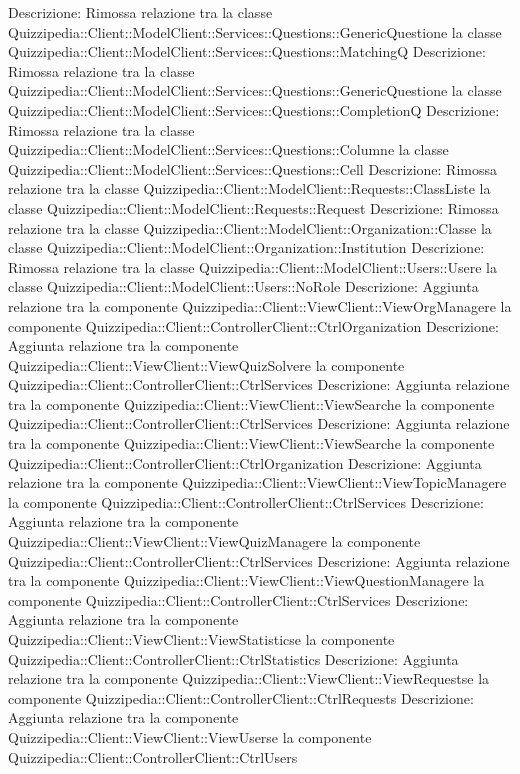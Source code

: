 Descrizione: Rimossa relazione tra la classe Quizzipedia::Client::ModelClient::Services::Questions::GenericQuestione la classe Quizzipedia::Client::ModelClient::Services::Questions::MatchingQ 
Descrizione: Rimossa relazione tra la classe Quizzipedia::Client::ModelClient::Services::Questions::GenericQuestione la classe Quizzipedia::Client::ModelClient::Services::Questions::CompletionQ 
Descrizione: Rimossa relazione tra la classe Quizzipedia::Client::ModelClient::Services::Questions::Columne la classe Quizzipedia::Client::ModelClient::Services::Questions::Cell 
Descrizione: Rimossa relazione tra la classe Quizzipedia::Client::ModelClient::Requests::ClassListe la classe Quizzipedia::Client::ModelClient::Requests::Request 
Descrizione: Rimossa relazione tra la classe Quizzipedia::Client::ModelClient::Organization::Classe la classe Quizzipedia::Client::ModelClient::Organization::Institution 
Descrizione: Rimossa relazione tra la classe Quizzipedia::Client::ModelClient::Users::Usere la classe Quizzipedia::Client::ModelClient::Users::NoRole 
Descrizione: Aggiunta relazione tra la componente Quizzipedia::Client::ViewClient::ViewOrgManagere la componente Quizzipedia::Client::ControllerClient::CtrlOrganization 
Descrizione: Aggiunta relazione tra la componente Quizzipedia::Client::ViewClient::ViewQuizSolvere la componente Quizzipedia::Client::ControllerClient::CtrlServices 
Descrizione: Aggiunta relazione tra la componente Quizzipedia::Client::ViewClient::ViewSearche la componente Quizzipedia::Client::ControllerClient::CtrlServices 
Descrizione: Aggiunta relazione tra la componente Quizzipedia::Client::ViewClient::ViewSearche la componente Quizzipedia::Client::ControllerClient::CtrlOrganization 
Descrizione: Aggiunta relazione tra la componente Quizzipedia::Client::ViewClient::ViewTopicManagere la componente Quizzipedia::Client::ControllerClient::CtrlServices 
Descrizione: Aggiunta relazione tra la componente Quizzipedia::Client::ViewClient::ViewQuizManagere la componente Quizzipedia::Client::ControllerClient::CtrlServices 
Descrizione: Aggiunta relazione tra la componente Quizzipedia::Client::ViewClient::ViewQuestionManagere la componente Quizzipedia::Client::ControllerClient::CtrlServices 
Descrizione: Aggiunta relazione tra la componente Quizzipedia::Client::ViewClient::ViewStatisticse la componente Quizzipedia::Client::ControllerClient::CtrlStatistics 
Descrizione: Aggiunta relazione tra la componente Quizzipedia::Client::ViewClient::ViewRequestse la componente Quizzipedia::Client::ControllerClient::CtrlRequests 
Descrizione: Aggiunta relazione tra la componente Quizzipedia::Client::ViewClient::ViewUserse la componente Quizzipedia::Client::ControllerClient::CtrlUsers 
